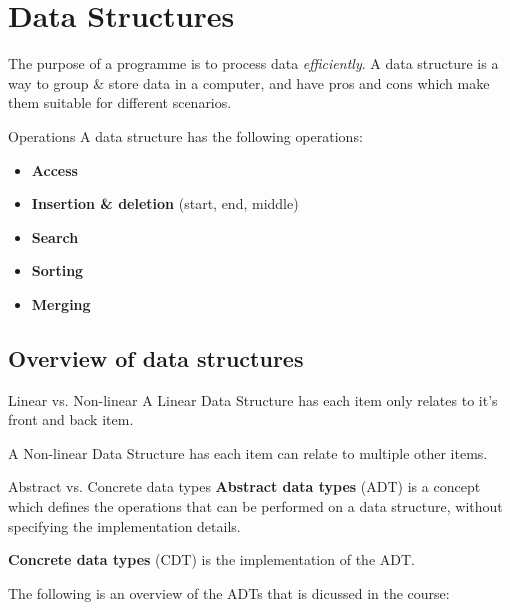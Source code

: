 \section{Data Structures}

The purpose of a programme is to process data \textit{efficiently}.
A data structure is a way to group \& store data in a computer, and have pros and cons which make them suitable for different scenarios.

\begin{knBox}
    {Operations}
    A data structure has the following operations:
    \begin{itemize}
        \item \textbf{Access}
        \item \textbf{Insertion \& deletion} (start, end, middle)
        \item \textbf{Search}
        \item \textbf{Sorting}
        \item \textbf{Merging}
    \end{itemize}
\end{knBox}

\subsection{Overview of data structures}

\begin{definition}
    {Linear vs. Non-linear}
    A Linear Data Structure has each item only relates to it's front and back item.

    A Non-linear Data Structure has each item can relate to multiple other items.
\end{definition}

\begin{theorem}
    {Abstract vs. Concrete data types}
    \textbf{Abstract data types} (ADT) is a concept which defines the operations that can be performed on a data structure, without specifying the implementation details.

    \textbf{Concrete data types} (CDT) is the implementation of the ADT.
\end{theorem}

The following is an overview of the ADTs that is dicussed in the course:

